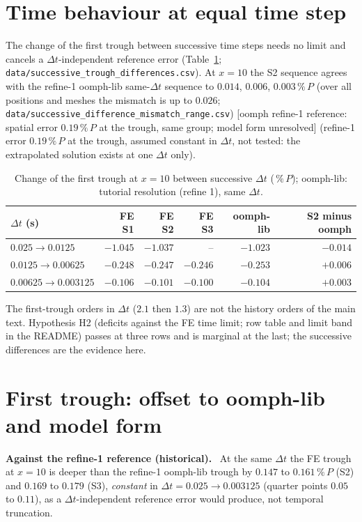 \documentclass[sn-mathphys,Numbered]{sn-jnl}
\newcommand{\urefOne}{{\small[oomph refine-1 reference: spatial error $0.19\,\%\,P$ at the trough, same group; model form unresolved]}}
\newcommand{\pP}{\ensuremath{\,\%\,P}}
\renewcommand{\paragraph}[1]{\par\vspace{0.15\baselineskip}\noindent\textbf{#1}\ }
\begin{document}
\section{Time behaviour at equal time step}\label{sec:cc_time}
The change of the first trough between successive time steps needs no limit and cancels a $\Delta t$-independent reference error (Table~\ref{tab:cc_succ}; \texttt{data/successive\_trough\_differences.csv}). At $x=10$ the S2 sequence agrees with the refine-1 oomph-lib same-$\Delta t$ sequence to $0.014$, $0.006$, $0.003\,\%\,P$ (over all positions and meshes the mismatch is up to $0.026$; \texttt{data/successive\_difference\_mismatch\_range.csv}) \urefOne{} (refine-1 error $0.19\,\%\,P$ at the trough, assumed constant in $\Delta t$, not tested: the extrapolated solution exists at one $\Delta t$ only).
\begin{table}[!htb]
\centering
\caption{Change of the first trough at $x=10$ between successive $\Delta t$ (\pP); oomph-lib: tutorial resolution (refine 1), same $\Delta t$.}\label{tab:cc_succ}
\small
\begin{tabular}{@{}lrrrrr@{}}
\toprule
$\Delta t$ (s) & FE S1 & FE S2 & FE S3 & oomph-lib & S2 minus oomph \\
\midrule
$0.025\to0.0125$ & $-1.045$ & $-1.037$ & -- & $-1.023$ & $-0.014$ \\
$0.0125\to0.00625$ & $-0.248$ & $-0.247$ & $-0.246$ & $-0.253$ & $+0.006$ \\
$0.00625\to0.003125$ & $-0.106$ & $-0.101$ & $-0.100$ & $-0.104$ & $+0.003$ \\
\bottomrule
\end{tabular}
\end{table}
The first-trough orders in $\Delta t$ ($2.1$ then $1.3$) are not the history orders of the main text. Hypothesis H2 (deficits against the FE time limit; row table and limit band in the README) passes at three rows and is marginal at the last; the successive differences are the evidence here.

\section{First trough: offset to oomph-lib and model form}\label{sec:cc_offset}
\paragraph{Against the refine-1 reference (historical).}
At the same $\Delta t$ the FE trough at $x=10$ is deeper than the refine-1 oomph-lib trough by $0.147$ to $0.161\,\%\,P$ (S2) and $0.169$ to $0.179$ (S3), \emph{constant} in $\Delta t=0.025\to0.003125$ (quarter points $0.05$ to $0.11$), as a $\Delta t$-independent reference error would produce, not temporal truncation.
\end{document}
